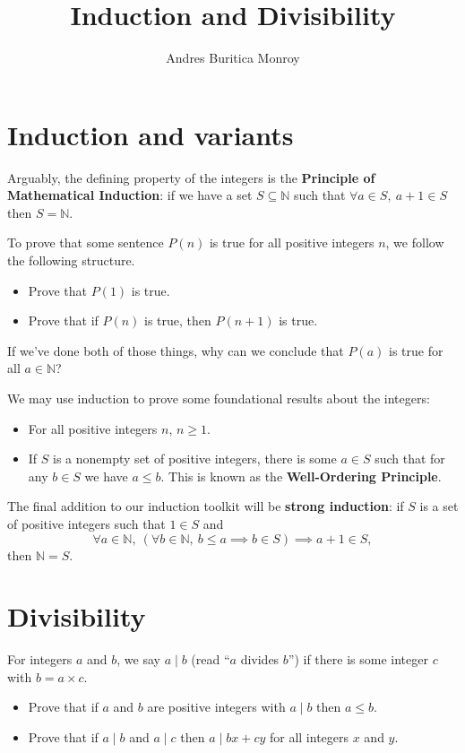 \documentclass{article}
\title{Induction and Divisibility}
\author{Andres Buritica Monroy}
\date{}
\begin{document}
\maketitle
\section{Induction and variants}
  Arguably, the defining property of the integers is the \textbf{Principle of
    Mathematical Induction}: if we have a set $S\subseteq\mathbb N$ such that
    $\forall a\in S,\ a+1\in S$ then $S=\mathbb N$.
  
  To prove that some sentence $P(n)$ is true for all positive integers $n$, we
  follow the following structure.
  \begin{itemize}
    \item Prove that $P(1)$ is true.
    \item Prove that if $P(n)$ is true, then $P(n+1)$ is true.
  \end{itemize}
  If we've done both of those things, why can we conclude that $P(a)$ is true
  for all $a\in\mathbb N$?

  We may use induction to prove some foundational results about the integers:
  \begin{itemize}
    \item For all positive integers $n$, $n\ge 1$.
    \item If $S$ is a nonempty set of positive integers, there is some $a\in
      S$ such that for any $b\in S$ we have $a\le b$.
    This is known as the \textbf{Well-Ordering Principle}.
  \end{itemize}

  The final addition to our induction toolkit will be \textbf{strong induction}:
  if $S$ is a set of positive integers such that $1\in S$ and
      \[\forall a\in \mathbb N,\ (\forall b\in\mathbb N,\ b\le a\implies b\in
        S)\implies a+1\in S,\]
        then $\mathbb N=S$.
\section{Divisibility}
  For integers $a$ and $b$, we say $a\mid b$ (read ``$a$ divides
  $b$'') if there is some integer $c$ with $b=a\times c$.
  \begin{itemize}
    \item Prove that if $a$ and $b$ are positive integers with $a\mid b$ then
      $a\le b$.
    \item Prove that if $a\mid b$ and $a\mid c$ then $a\mid bx+cy$ for all
      integers $x$ and $y$.
  \end{itemize}
\end{document}
